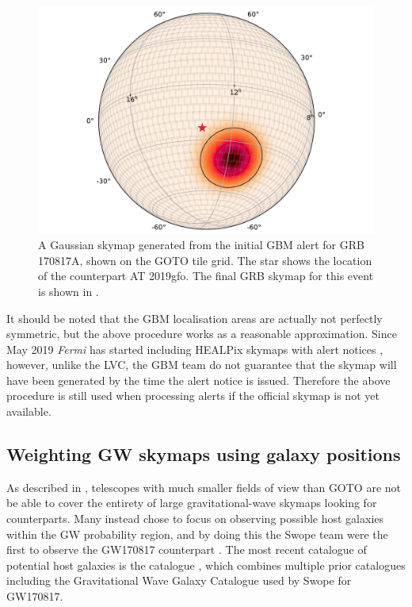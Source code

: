 \begin{colsection}
\begin{colsection}
\begin{figure}[t]
    \begin{center}
        \includegraphics[width=\linewidth]{images/tiling/170817_fermi.pdf}
    \end{center}
    \caption[Gaussian skymap for GRB 170817A]{
        A Gaussian skymap generated from the initial GBM alert for GRB 170817A, shown on the GOTO tile grid. The  star shows the location of the counterpart AT 2019gfo. The final GRB skymap for this event is shown in .
    }\label{fig:170817_grb}
\end{figure}

It should be noted that the GBM localisation areas are actually not perfectly symmetric, but the above procedure works as a reasonable approximation. Since May 2019 \textit{Fermi} has started including HEALPix skymaps with alert notices \citep{Fermi_skymaps}, however, unlike the LVC, the GBM team do not guarantee that the skymap will have been generated by the time the alert notice is issued. Therefore the above procedure is still used when processing alerts if the official skymap is not yet available.

\end{colsection}

\newpage
\subsection{Weighting GW skymaps using galaxy positions}
\label{sec:galaxy_skymaps}
\begin{colsection}

As described in , telescopes with much smaller fields of view than GOTO are not be able to cover the entirety of large gravitational-wave skymaps looking for counterparts. Many instead chose to focus on observing possible host galaxies within the GW probability region, and by doing this the Swope team were the first to observe the GW170817 counterpart \citep{GW170817_Swope}. The most recent catalogue of potential host galaxies is the  catalogue \citep{GLADE}, which combines multiple prior catalogues including the Gravitational Wave Galaxy Catalogue \citep[GWGC,][]{GWGC} used by Swope for GW170817.


\end{colsection}
\end{colsection}
